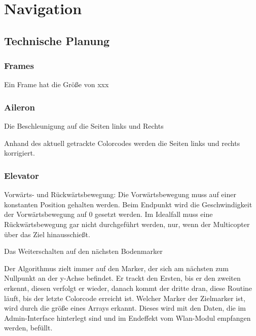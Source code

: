 \section{Navigation}

  \subsection{Technische Planung}
  
    \subsubsection{Frames}


    Ein Frame hat die Größe von xxx

    \subsubsection{Aileron}

    Die Beschleunigung auf die Seiten links und Rechts

    Anhand des aktuell getrackte Colorcodes werden die Seiten links und rechts korrigiert. 



    \subsubsection{Elevator}

    Vorwärts- und Rückwärtsbewegung: Die Vorwärtsbewegung muss auf einer konstanten Position gehalten werden. Beim Endpunkt wird die Geschwindigkeit der Vorwärtsbewegung auf 0 gesetzt werden. Im Idealfall muss eine Rückwärtsbewegung gar nicht durchgeführt werden, nur, wenn der Multicopter über das Ziel hinausschießt.

    Das Weiterschalten auf den nächsten Bodenmarker

    Der Algorithmus zielt immer auf den Marker, der sich am nächsten zum Nullpunkt an der y-Achse befindet. Er trackt den Ersten, bis er den zweiten erkennt, diesen verfolgt er wieder, danach kommt der dritte dran, diese Routine läuft, bis der letzte Colorcode erreicht ist. Welcher Marker der Zielmarker ist, wird durch die größe eines Arrays erkannt. Dieses wird mit den Daten, die im Admin-Interface hinterlegt sind und im Endeffekt vom Wlan-Modul empfangen werden, befüllt.

